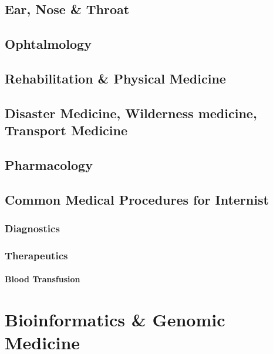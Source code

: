 \documentclass[
  letterpaper,
  DIV=11,
  numbers=noendperiod]{scrreprt}
\begin{document}
\chapter{Ear, Nose \& Throat}\label{ear-nose-throat}

\chapter{Ophtalmology}\label{ophtalmology}

\chapter{Rehabilitation \& Physical
Medicine}\label{rehabilitation-physical-medicine}

\chapter{Disaster Medicine, Wilderness medicine, Transport
Medicine}\label{disaster-medicine-wilderness-medicine-transport-medicine}


\chapter{Pharmacology}\label{pharmacology}


\chapter{Common Medical Procedures for
Internist}\label{common-medical-procedures-for-internist}

\section{Diagnostics}\label{diagnostics}

\section{Therapeutics}\label{therapeutics}

\subsection{Blood Transfusion}\label{blood-transfusion}

\part{Bioinformatics \& Genomic Medicine}
\end{document}

